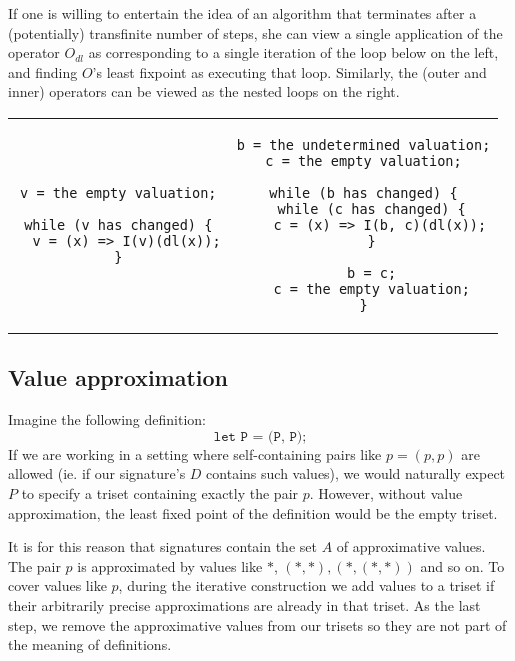 \documentclass[oneside,12pt]{book}
\theoremstyle{definition}
\theoremstyle{remark}
\newcommand\var[1]{\mathop{\mathit{#1}}\nolimits}
\newcommand{\dl}{\var{dl}}
\begin{document}
If one is willing to entertain the idea of an algorithm that terminates
after a (potentially) transfinite number of steps, she can view a single application
of the operator $O_{\dl}$ as corresponding to a single iteration of the loop below
on the left, and finding $O$'s least fixpoint as executing that loop.
Similarly, the (outer and inner) operators can be viewed as the nested loops on the right.
%
\begin{center}
\begin{tabular}{c|c}
\begin{lstlisting}[basicstyle=\footnotesize]
v = the empty valuation;

while (v has changed) {
  v = (x) => I(v)(dl(x));
}
\end{lstlisting} &
\begin{lstlisting}[basicstyle=\footnotesize]
b = the undetermined valuation;
c = the empty valuation;

while (b has changed) {
  while (c has changed) {
    c = (x) => I(b, c)(dl(x));
  }
  
  b = c;
  c = the empty valuation;
}
\end{lstlisting}
\end{tabular}
\end{center}

\subsection{Value approximation}
Imagine the following definition: \[\texttt{let P = (P, P);}\] If we are working
in a setting where self-containing pairs like $p = (p, p)$ are allowed
(ie. if our signature's $D$ contains such values), we would naturally expect
$P$ to specify a triset containing exactly the pair $p$. However,
without value approximation, the least fixed point of the definition would be
the empty triset.

It is for this reason that signatures contain the set $A$ of approximative
values. The pair $p$ is approximated by values like $*$, $(*, *), (*, (*, *))$
and so on. To cover values like $p$, during the iterative construction we add values
to a triset if their arbitrarily precise approximations are already in that triset.
As the last step, we remove the approximative values from our trisets so they are
not part of the meaning of definitions.
\end{document}
